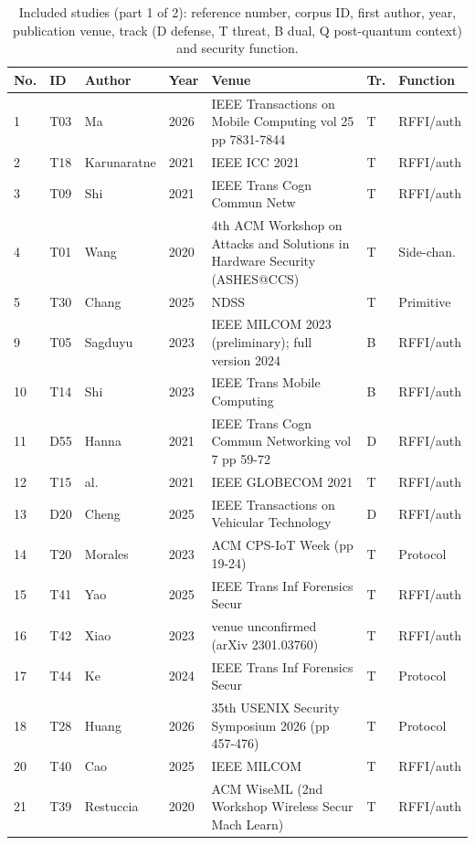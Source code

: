 \begin{table}[p]
\centering
\scriptsize
\setlength{\tabcolsep}{2.5pt}
\caption{Included studies (part 1 of 2): reference number, corpus ID, first author, year, publication venue, track (D defense, T threat, B dual, Q post-quantum context) and security function.}
\label{tab:corpus}
\begin{tabular}{@{}lllll>{\raggedright\arraybackslash}p{3.3cm}>{\raggedright\arraybackslash}p{1.9cm}@{}}
\toprule
No. & ID & Author & Year & Venue & Tr. & Function \\
\midrule
1 & T03 & Ma & 2026 & IEEE Transactions on Mobile Computing vol 25 pp 7831-7844 & T & RFFI/auth \\
2 & T18 & Karunaratne & 2021 & IEEE ICC 2021 & T & RFFI/auth \\
3 & T09 & Shi & 2021 & IEEE Trans Cogn Commun Netw & T & RFFI/auth \\
4 & T01 & Wang & 2020 & 4th ACM Workshop on Attacks and Solutions in Hardware Security (ASHES@CCS) & T & Side-chan. \\
5 & T30 & Chang & 2025 & NDSS & T & Primitive \\
9 & T05 & Sagduyu & 2023 & IEEE MILCOM 2023 (preliminary); full version 2024 & B & RFFI/auth \\
10 & T14 & Shi & 2023 & IEEE Trans Mobile Computing & B & RFFI/auth \\
11 & D55 & Hanna & 2021 & IEEE Trans Cogn Commun Networking vol 7 pp 59-72 & D & RFFI/auth \\
12 & T15 & al. & 2021 & IEEE GLOBECOM 2021 & T & RFFI/auth \\
13 & D20 & Cheng & 2025 & IEEE Transactions on Vehicular Technology & D & RFFI/auth \\
14 & T20 & Morales & 2023 & ACM CPS-IoT Week (pp 19-24) & T & Protocol \\
15 & T41 & Yao & 2025 & IEEE Trans Inf Forensics Secur & T & RFFI/auth \\
16 & T42 & Xiao & 2023 & venue unconfirmed (arXiv 2301.03760) & T & RFFI/auth \\
17 & T44 & Ke & 2024 & IEEE Trans Inf Forensics Secur & T & Protocol \\
18 & T28 & Huang & 2026 & 35th USENIX Security Symposium 2026 (pp 457-476) & T & Protocol \\
20 & T40 & Cao & 2025 & IEEE MILCOM & T & RFFI/auth \\
21 & T39 & Restuccia & 2020 & ACM WiseML (2nd Workshop Wireless Secur Mach Learn) & T & RFFI/auth \\

\end{tabular}
\end{table}
